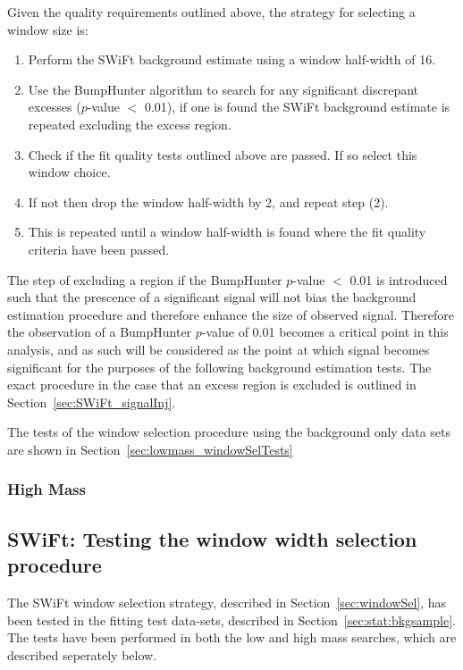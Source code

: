 \noindent
Given the quality requirements outlined above, the strategy for selecting a window size is:
\begin{enumerate}
\item Perform the SWiFt background estimate using a window half-width of 16.
\item Use the {\sc BumpHunter} algorithm to search for any significant discrepant excesses (\mbox{$p$-value} $<$ 0.01),
  if one is found the SWiFt background estimate is repeated excluding the excess region.
\item Check if the fit quality tests outlined above are passed. If so select this window choice.
\item If not then drop the window half-width by 2, and repeat step (2).
\item This is repeated until a window half-width is found where the fit quality criteria have been passed.
\end{enumerate}
The step of excluding a region if the {\sc BumpHunter} \mbox{$p$-value} $<$ 0.01 is introduced such that
the prescence of a significant signal will not bias the background estimation procedure and therefore enhance the size of observed signal.
Therefore the observation of a {\sc BumpHunter} \mbox{$p$-value} of 0.01 becomes a critical point in this analysis,
and as such will be considered as the point at which signal becomes significant for the purposes of the following background estimation tests.
The exact procedure in the case that an excess region is excluded is outlined in Section~\ref{sec:SWiFt_signalInj}.

\noindent
The tests of the window selection procedure using the background only data sets are shown in Section~\ref{sec:lowmass_windowSelTests}

\subsubsection{High Mass} 
\label{sec:highmass_windowSel}

\subsection{SWiFt: Testing the window width selection procedure}

The SWiFt window selection strategy, described in Section~\ref{sec:windowSel}, has been tested in the fitting test data-sets, described in Section~\ref{sec:stat:bkgsample}.
The tests have been performed in both the low and high mass searches, which are described seperately below.

